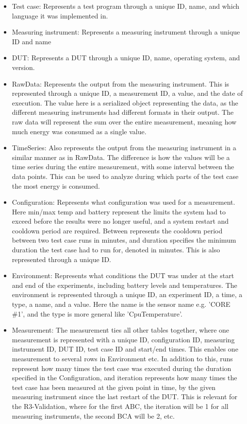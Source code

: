 \begin{itemize}
    \item Test case: Represents a test program through a unique ID, name, and which language it was implemented in.
    \item Measuring instrument: Represents a measuring instrument through a unique ID and name
    \item DUT: Represents a DUT through a unique ID, name, operating system, and version. 
    \item RawData: Represents the output from the measuring instrument. This is represented through a unique ID, a measurement ID, a value, and the date of execution. The value here is a serialized object representing the data, as the different measuring instruments had different formats in their output. The raw data will represent the sum over the entire measurement, meaning how much energy was consumed as a single value.
    \item TimeSeries: Also represents the output from the measuring instrument in a similar manner as in RawData. The difference is how the values will be a time series during the entire measurement, with some interval between the data points. This can be used to analyze during which parts of the test case the most energy is consumed.
    \item Configuration: Represents what configuration was used for a measurement. Here min/max temp and battery represent the limits the system had to exceed before the results were no longer useful, and a system restart and cooldown period are required. Between represents the cooldown period between two test case runs in minutes, and duration specifies the minimum duration the test case had to run for, denoted in minutes. This is also represented through a unique ID.
    \item Environment: Represents what conditions the DUT was under at the start and end of the experiments, including battery levels and temperatures. The environment is represented through a unique ID, an experiment ID, a time, a type, a name, and a value. Here the name is the sensor name e.g. 'CORE \#1', and the type is more general like 'CpuTemperature'.
    \item Measurement: The measurement ties all other tables together, where one measurement is represented with a unique ID, configuration ID, measuring instrument ID, DUT ID, test case ID and start/end times. This enables one measurement to several rows in Environment etc. In addition to this, runs represent how many times the test case was executed during the duration specified in the Configuration, and iteration represents how many times the test case has been measured at the given point in time, by the given measuring instrument since the last restart of the DUT. This is relevant for the R3-Validation, where for the first ABC, the iteration will be 1 for all measuring instruments, the second BCA will be 2, etc.
\end{itemize}

